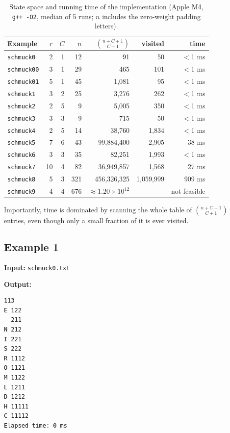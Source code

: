 \documentclass[a4paper,10pt,english]{scrartcl}
\begin{document}
\begin{table}[h]
\centering
\caption{State space and running time of the implementation (Apple M4, \texttt{g++ -O2}, median of 5 runs; $n$ includes the zero-weight padding letters).}
\begin{tabular}{lrrrrrr}
\hline
Example & $r$ & $C$ & $n$ & $\binom{n+C+1}{C+1}$ & visited & time \\
\hline
\texttt{schmuck0}  & 2  & 1 & 12  & 91            & 50        & $<$1 ms \\
\texttt{schmuck00} & 3  & 1 & 29  & 465           & 101       & $<$1 ms \\
\texttt{schmuck01} & 5  & 1 & 45  & 1{,}081       & 95        & $<$1 ms \\
\texttt{schmuck1}  & 3  & 2 & 25  & 3{,}276       & 262       & $<$1 ms \\
\texttt{schmuck2}  & 2  & 5 & 9   & 5{,}005       & 350       & $<$1 ms \\
\texttt{schmuck3}  & 3  & 3 & 9   & 715           & 50        & $<$1 ms \\
\texttt{schmuck4}  & 2  & 5 & 14  & 38{,}760      & 1{,}834   & $<$1 ms \\
\texttt{schmuck5}  & 7  & 6 & 43  & 99{,}884{,}400 & 2{,}905  & 38 ms \\
\texttt{schmuck6}  & 3  & 3 & 35  & 82{,}251      & 1{,}993   & $<$1 ms \\
\texttt{schmuck7}  & 10 & 4 & 82  & 36{,}949{,}857 & 1{,}568  & 27 ms \\
\texttt{schmuck8}  & 5  & 3 & 321 & 456{,}326{,}325 & 1{,}059{,}999 & 909 ms \\
\texttt{schmuck9}  & 4  & 4 & 676 & $\approx 1.20\times10^{12}$ & --- & not feasible \\
\hline
\end{tabular}
\label{tab:runtime}
\end{table}

Importantly, time is dominated by scanning the whole table of $\binom{n+C+1}{C+1}$ entries, even though only a small fraction of it is ever visited. 

\subsection{Example 1}\label{ex:1}

\textbf{Input:} \texttt{schmuck0.txt}

\textbf{Output:}

\begin{verbatim}
113
E 122
  211
N 212
I 221
S 222
R 1112
O 1121
M 1122
L 1211
D 1212
H 11111
C 11112
Elapsed time: 0 ms
\end{verbatim}
\end{document}
